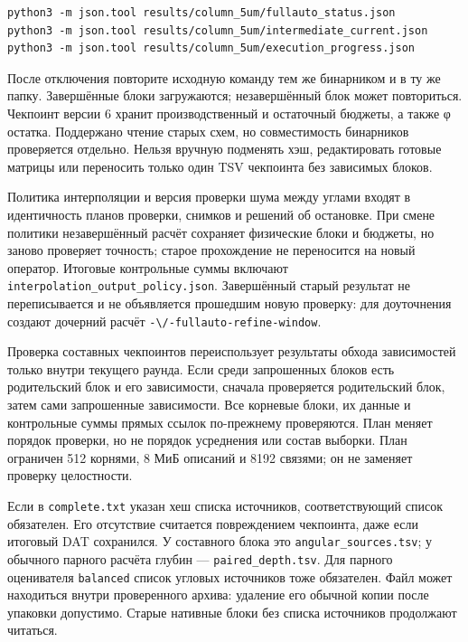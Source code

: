 \noindent\begin{minipage}{\linewidth}
\begin{verbatim}
python3 -m json.tool results/column_5um/fullauto_status.json
python3 -m json.tool results/column_5um/intermediate_current.json
python3 -m json.tool results/column_5um/execution_progress.json
\end{verbatim}
\end{minipage}

После отключения повторите исходную команду тем же бинарником и в ту же
папку. Завершённые блоки загружаются; незавершённый блок может
повториться. Чекпоинт версии 6 хранит производственный и остаточный
бюджеты, а также φ остатка. Поддержано чтение старых схем, но
совместимость бинарников проверяется отдельно. Нельзя вручную подменять
хэш, редактировать готовые матрицы или переносить только один TSV
чекпоинта без зависимых блоков.

Политика интерполяции и версия проверки шума между углами входят в
идентичность планов проверки, снимков и решений об остановке. При смене
политики незавершённый расчёт сохраняет физические блоки и бюджеты, но
заново проверяет точность; старое прохождение не переносится на новый
оператор. Итоговые контрольные суммы включают
\nolinkurl{interpolation_output_policy.json}. Завершённый старый
результат не переписывается и не объявляется прошедшим новую проверку:
для доуточнения создают дочерний расчёт
\nolinkurl{-\/-fullauto-refine-window}.

Проверка составных чекпоинтов переиспользует результаты обхода
зависимостей только внутри текущего раунда. Если среди запрошенных
блоков есть родительский блок и его зависимости, сначала проверяется
родительский блок, затем сами запрошенные зависимости. Все корневые
блоки, их данные и контрольные суммы прямых ссылок по-прежнему
проверяются. План меняет порядок проверки, но не порядок усреднения или
состав выборки. План ограничен 512 корнями, 8 МиБ описаний и 8192
связями; он не заменяет проверку целостности.

Если в \texttt{complete.txt} указан хеш списка источников,
соответствующий список обязателен. Его отсутствие считается повреждением
чекпоинта, даже если итоговый DAT сохранился. У составного блока это
\nolinkurl{angular_sources.tsv}; у обычного парного расчёта глубин ---
\nolinkurl{paired_depth.tsv}. Для парного оценивателя \texttt{balanced}
список угловых источников тоже обязателен. Файл может находиться внутри
проверенного архива: удаление его обычной копии после упаковки
допустимо. Старые нативные блоки без списка источников продолжают
читаться.

